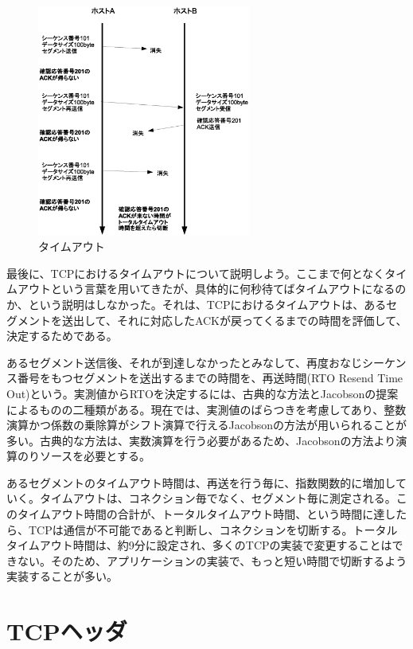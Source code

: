 \begin{figure}
	\includegraphics[width=7cm, clip]{draw/tcp09n.eps}
	\caption{タイムアウト}
	\label{fig:tcp09}
\end{figure}

最後に、TCPにおけるタイムアウトについて説明しよう。ここまで何となくタイムアウトという言葉を用いてきたが、具体的に何秒待てばタイムアウトになるのか、という説明はしなかった。それは、TCPにおけるタイムアウトは、あるセグメントを送出して、それに対応したACKが戻ってくるまでの時間を評価して、決定するためである。



あるセグメント送信後、それが到達しなかったとみなして、再度おなじシーケンス番号をもつセグメントを送出するまでの時間を、再送時間(RTO Resend Time Out)という。実測値からRTOを決定するには、古典的な方法とJacobsonの提案によるものの二種類がある。現在では、実測値のばらつきを考慮してあり、整数演算かつ係数の乗除算がシフト演算で行えるJacobsonの方法が用いられることが多い。古典的な方法は、実数演算を行う必要があるため、Jacobsonの方法より演算のりソースを必要とする。

あるセグメントのタイムアウト時間は、再送を行う毎に、指数関数的に増加していく。タイムアウトは、コネクション毎でなく、セグメント毎に測定される。このタイムアウト時間の合計が、トータルタイムアウト時間、という時間に達したら、TCPは通信が不可能であると判断し、コネクションを切断する。トータルタイムアウト時間は、約9分に設定され、多くのTCPの実装で変更することはできない。そのため、アプリケーションの実装で、もっと短い時間で切断するよう実装することが多い。

\section{TCPヘッダ}

